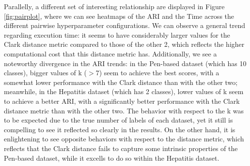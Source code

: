 Parallelly, a different set of interesting relationship are displayed in Figure \ref{fig:pairplot}, where we can see heatmaps of the ARI and the Time across the different pairwise hyperparameter configurations. We can observe a general trend regarding execution time: it seems to have considerably larger values for the Clark distance metric compared to those of the other 2, which reflects the higher computational cost that this distance metric has. Additionally, we see a noteworthy divergence in the ARI trends: in the Pen-based dataset (which has 10 classes), bigger values of k ($>$7) seem to achieve the best scores, with a somewhat lower performance with the Clark distance than with the other two; meanwhile, in the Hepatitis dataset (which has 2 classes), lower values of k seem to achieve a better ARI, with a significantly better performance with the Clark distance metric than with the other two. The behavior with respect to the k was to be expected due to the true number of labels of each dataset, yet it still is compelling to see it reflected so clearly in the results. On the other hand, it is enlightening to see opposite behaviors with respect to the distance metric, which reflects that the Clark distance fails to capture some intrinsic properties of the Pen-based dataset, while it excells to do so within the Hepatitis dataset.

